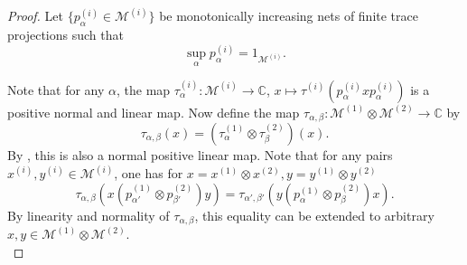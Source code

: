\documentclass[sn-mathphys-num]{sn-jnl}%
\newcommand{\CC}{\mathbb{C}}
\newcommand{\MM}{\mathcal{M}}
\numberwithin{equation}{section}
\theoremstyle{thmstyleone}%
\theoremstyle{thmstyletwo}%
\theoremstyle{thmstylethree}%
\begin{document}
\begin{proof}
    Let $\{p_\alpha^{(i)}\in \MM^{(i)}\}$ be monotonically increasing nets of finite trace projections such that
    \begin{equation}
        \sup_{\alpha}p_\alpha^{(i)}=1_{\MM^{(i)}}.
    \end{equation}
    
    Note that for any $\alpha$, the map $\tau^{(i)}_\alpha:\MM^{(i)}\to\CC$, $x\mapsto \tau^{(i)}(p^{(i)}_\alpha xp^{(i)}_\alpha)$ is a positive normal and linear map. Now define the map $\tau_{\alpha,\beta}:\MM^{(1)}\otimes\MM^{(2)}\to\CC$ by
   \begin{equation}
       \tau_{\alpha,\beta}(x)=\left(\tau_\alpha^{(1)}\otimes\tau_\beta^{(2)}\right)(x).
   \end{equation}
   By \cite[Prop.\ 11.2.7.]{kadison1997fundamentals}, this is also a normal positive linear map. Note that for any pairs $x^{(i)},y^{(i)}\in \MM^{(i)}$, one has for $x=x^{(1)}\otimes x^{(2)}, y=y^{(1)}\otimes y^{(2)}$
   \begin{equation}
       \label{eq:pretrace_property}
       \tau_{\alpha,\beta}(x(p^{(1)}_{\alpha'}\otimes p^{(2)}_{\beta'})y)=\tau_{\alpha',\beta'}(y(p^{(1)}_\alpha\otimes p^{(2)}_\beta)x).
   \end{equation}
   By linearity and normality of $\tau_{\alpha,\beta}$, this equality can be extended to arbitrary $x,y\in \MM^{(1)}\otimes\MM^{(2)}$.\\


\end{proof}
\end{document}
